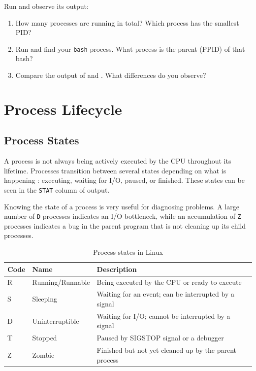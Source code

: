 \begin{exercisebox}[5.1]
  Run  and observe its output:
  \begin{enumerate}
    \item How many processes are running in total? Which process has the
      smallest PID?
    \item Run  and find your \texttt{bash} process. What
      process is the parent (PPID) of that bash?
    \item Compare the output of  and . What
      differences do you observe?
  \end{enumerate}
\end{exercisebox}

\section{Process Lifecycle}
\label{sec:process-lifecycle}

\subsection{Process States}

A process is not always being actively executed by the CPU throughout its
lifetime. Processes transition between several states depending on what is
happening : executing, waiting for I/O, paused, or finished. These states
can be seen in the \texttt{STAT} column of  output.

Knowing the state of a process is very useful for diagnosing problems. A large
number of \texttt{D} processes indicates an I/O bottleneck, while an
accumulation of \texttt{Z} processes indicates a bug in the parent program
that is not cleaning up its child processes.

\begin{table}[htbp]
  \centering
  \caption{Process states in Linux}
  \begin{tabular}{lll}
    \hline
    \textbf{Code} & \textbf{Name} & \textbf{Description} \\
    \hline
    R & Running/Runnable & Being executed by the CPU or ready to execute \\
    S & Sleeping         & Waiting for an event; can be interrupted by a signal \\
    D & Uninterruptible  & Waiting for I/O; cannot be interrupted by a signal \\
    T & Stopped          & Paused by SIGSTOP signal or a debugger \\
    Z & Zombie           & Finished but not yet cleaned up by the parent process \\
    \hline
  \end{tabular}
\end{table}


